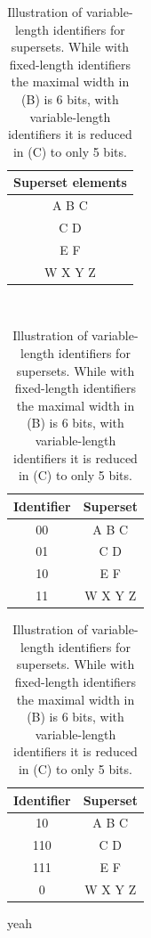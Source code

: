 \begin{table}[t!]
\small

\centering
\begin{subtable}[t]{0.35\linewidth}
\caption{Supersets}\label{Table_variable_a}
\begin{tabular}{|c|}
\hline
Superset elements\\
\hline
A B C\\
C D\\
E F\\
W X Y Z\\
\hline
\end{tabular}
\end{subtable}\\


\begin{subtable}[t]{0.49\linewidth}
\caption{Fixed-length Identifiers}\label{Table_variable_b}
\begin{tabular}{|c|c|}
\hline
Identifier   &  Superset\\
\hline
00 & A B C\\
01 &  C D\\
10 &  E F\\
11 &  W X Y Z\\
\hline
\end{tabular}
\end{subtable}
\hfill
\begin{subtable}[t]{0.49\linewidth}
\caption{Variable-length Identifiers}\label{Table_variable_c}
\begin{tabular}{|c|c|}
\hline
Identifier   &  Superset\\
\hline
10 & A B C\\
110 &  C D\\
111 &  E F\\
0 &  W X Y Z\\
\hline
\end{tabular}
\end{subtable}

\caption{Illustration of variable-length identifiers for supersets. While with fixed-length identifiers the maximal width in (B) is 6 bits, with variable-length identifiers it is reduced in (C) to only 5 bits.
}\label{Table_variable}
\end{table}


yeah

